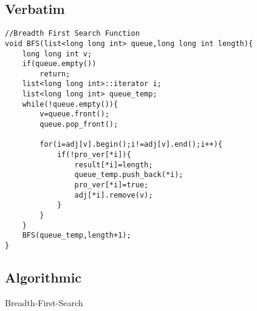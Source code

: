 \documentclass[12pt,a4paper]{article}
\begin{document}
{\subsection{Verbatim}
 \large{
\begin{verbatim}
//Breadth First Search Function
void BFS(list<long long int> queue,long long int length){
    long long int v;
    if(queue.empty())
        return;
    list<long long int>::iterator i;
    list<long long int> queue_temp;
    while(!queue.empty()){
        v=queue.front();
        queue.pop_front();

        for(i=adj[v].begin();i!=adj[v].end();i++){
            if(!pro_ver[*i]){
                result[*i]=length;
                queue_temp.push_back(*i);
                pro_ver[*i]=true;
                adj[*i].remove(v);
            }
        }
    }
    BFS(queue_temp,length+1);
}
\end{verbatim}
}
\clearpage



\subsection{Algorithmic}
{
\begin{algorithm}
\begin{framed}


\end{framed}

\caption{Breadth-First-Search}
\end{algorithm}
}}
\end{document}
